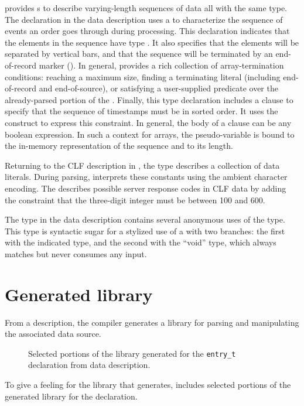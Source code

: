 \pads{} provides s to describe varying-length sequences of
data all with the same type.  The  declaration in the
\dibbler{} data description uses a  to characterize the
sequence of events an order goes through during processing.  This
declaration indicates that the elements in the sequence have type
.  It also specifies that the elements will be separated
by vertical bars, and that the sequence will be terminated by an
end-of-record marker ().  In general, \pads{} provides a rich
collection of array-termination conditions: reaching a maximum size,
finding a terminating literal (including end-of-record and
end-of-source), or satisfying a user-supplied predicate over the
already-parsed portion of the .  Finally, this type
declaration includes a  clause to specify that the sequence
of timestamps must be in sorted order.  It uses the 
construct to express this constraint.  In general, the body of a
 clause can be any boolean expression.  In such a context
for arrays, the pseudo-variable  is bound to the in-memory
representation of the sequence and  to its length.

Returning to the CLF description in , the
 type  describes a collection of data literals.
During parsing, \pads{} interprets these constants using the ambient
character encoding.  The   describes
possible server response codes in CLF data by adding the constraint
that the three-digit integer must be between 100 and 600.

The  type in the \dibbler{} data description
contains several anonymous uses of the  type.  This type is
syntactic sugar for a stylized use of a  with two branches:
the first with the indicated type, and the second with the ``void''
type, which always matches but never consumes any input.



\section{Generated library}
\label{sec:example:generated-library}
From a description, the \pads{} compiler generates a \C{} library
for parsing and manipulating the associated data source.  
\setcounter{totalnumber}{1}
\setcounter{dbltopnumber}{1}
\renewcommand{\topfraction}{0.85}
\renewcommand{\textfraction}{0.1}
\renewcommand{\floatpagefraction}{0.75}
\begin{figure*}
\caption{Selected portions of the library generated for the \texttt{entry\_t}
  declaration from \dibbler{} data description.}
\label{figure:library}
\end{figure*}
To give a feeling for the library that \pads{} generates, 
 includes selected portions of the generated 
library for the \dibbler{}  declaration.


